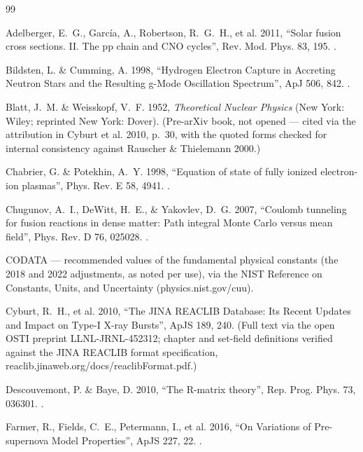 \begingroup
\raggedright
\begin{thebibliography}{99}

Adelberger, E.~G., Garc\'ia, A., Robertson, R.~G.~H., et al. 2011, ``Solar
fusion cross sections. II. The pp chain and CNO cycles'', Rev. Mod. Phys. 83,
195. .

Bildsten, L. \& Cumming, A. 1998, ``Hydrogen Electron Capture in Accreting
Neutron Stars and the Resulting g-Mode Oscillation Spectrum'', ApJ 506, 842.
.

Blatt, J.~M. \& Weisskopf, V.~F. 1952, \emph{Theoretical Nuclear Physics} (New
York: Wiley; reprinted New York: Dover). (Pre-arXiv book, not opened --- cited
via the attribution in Cyburt et al. 2010, p.~30, with the quoted forms checked
for internal consistency against Rauscher \& Thielemann 2000.)

Chabrier, G. \& Potekhin, A.~Y. 1998, ``Equation of state of fully ionized
electron-ion plasmas'', Phys. Rev. E 58, 4941. .

Chugunov, A.~I., DeWitt, H.~E., \& Yakovlev, D.~G. 2007, ``Coulomb tunneling
for fusion reactions in dense matter: Path integral Monte Carlo versus mean
field'', Phys. Rev. D 76, 025028. .

CODATA --- recommended values of the fundamental physical constants (the 2018
and 2022 adjustments, as noted per use), via the NIST Reference on Constants,
Units, and Uncertainty (physics.nist.gov/cuu).

Cyburt, R.~H., et al. 2010, ``The JINA REACLIB Database: Its Recent Updates and
Impact on Type-I X-ray Bursts'', ApJS 189, 240. (Full text via the open OSTI
preprint LLNL-JRNL-452312; chapter and set-field definitions verified against
the JINA REACLIB format specification,
reaclib.jinaweb.org/docs/reaclibFormat.pdf.)

Descouvemont, P. \& Baye, D. 2010, ``The R-matrix theory'', Rep. Prog. Phys.
73, 036301. .

Farmer, R., Fields, C.~E., Petermann, I., et al. 2016, ``On Variations of
Pre-supernova Model Properties'', ApJS 227, 22. .


\end{thebibliography}
